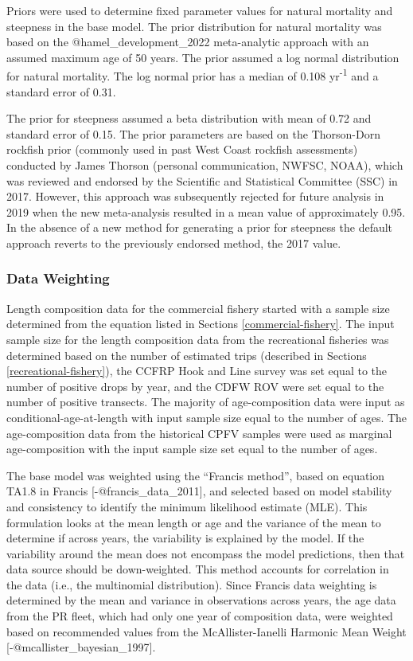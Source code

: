 \documentclass[11pt,
  letterpaper,
]{article}
\begin{document}
Priors were used to determine fixed parameter values for natural mortality and steepness in the base model. The prior distribution for natural mortality was based on the @hamel\_development\_2022 meta-analytic approach with an assumed maximum age of 50 years. The prior assumed a log normal distribution for natural mortality. The log normal prior has a median of 0.108 yr\textsuperscript{-1} and a standard error of 0.31.

The prior for steepness assumed a beta distribution with mean of 0.72 and standard error of 0.15. The prior parameters are based on the Thorson-Dorn rockfish prior (commonly used in past West Coast rockfish assessments) conducted by James Thorson (personal communication, NWFSC, NOAA), which was reviewed and endorsed by the Scientific and Statistical Committee (SSC) in 2017. However, this approach was subsequently rejected for future analysis in 2019 when the new meta-analysis resulted in a mean value of approximately 0.95. In the absence of a new method for generating a prior for steepness the default approach reverts to the previously endorsed method, the 2017 value.

\subsubsection{Data Weighting}\label{data-weighting}

Length composition data for the commercial fishery started with a sample size determined from the equation listed in Sections \ref{commercial-fishery}. The input sample size for the length composition data from the recreational fisheries was determined based on the number of estimated trips (described in Sections \ref{recreational-fishery}), the CCFRP Hook and Line survey was set equal to the number of positive drops by year, and the CDFW ROV were set equal to the number of positive transects. The majority of age-composition data were input as conditional-age-at-length with input sample size equal to the number of ages. The age-composition data from the historical CPFV samples were used as marginal age-composition with the input sample size set equal to the number of ages.

The base model was weighted using the ``Francis method'', based on equation TA1.8 in Francis {[}-@francis\_data\_2011{]}, and selected based on model stability and consistency to identify the minimum likelihood estimate (MLE). This formulation looks at the mean length or age and the variance of the mean to determine if across years, the variability is explained by the model. If the variability around the mean does not encompass the model predictions, then that data source should be down-weighted. This method accounts for correlation in the data (i.e., the multinomial distribution). Since Francis data weighting is determined by the mean and variance in observations across years, the age data from the PR fleet, which had only one year of composition data, were weighted based on recommended values from the McAllister-Ianelli Harmonic Mean Weight {[}-@mcallister\_bayesian\_1997{]}.
\end{document}
